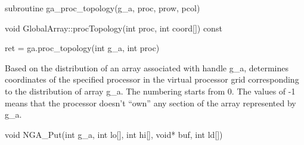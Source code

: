 \documentclass[12pt]{article}
\begin{document}
\begin{fapi}
\begin{fcode}
subroutine ga_proc_topology(g_a, proc, prow, pcol)
\end{fcode}
\begin{funcargs}
\end{funcargs}
\end{fapi}

\begin{cxxapi}
\begin{cxxcode}
void GlobalArray::procTopology(int proc, int coord[]) const
\end{cxxcode}
\begin{funcargs}
\end{funcargs}
\end{cxxapi}

\begin{pyapi}
\begin{pycode}
ret = ga.proc_topology(int g_a, int proc)
\end{pycode}
\begin{funcargs}
\end{funcargs}
\end{pyapi}

\local

\begin{desc}

Based on the distribution of an array associated with handle g_a, determines
coordinates of the specified processor in the virtual processor grid
corresponding to the distribution of array g_a. The numbering starts from 0.
The values of -1 means that the processor doesn't ``own'' any section of the
array represented by g_a.

\end{desc}



\begin{capi}
\begin{ccode}
void NGA_Put(int g_a, int lo[], int hi[], void* buf, int ld[])
\end{ccode}
\begin{funcargs}
\end{funcargs}
\end{capi}
\end{document}
